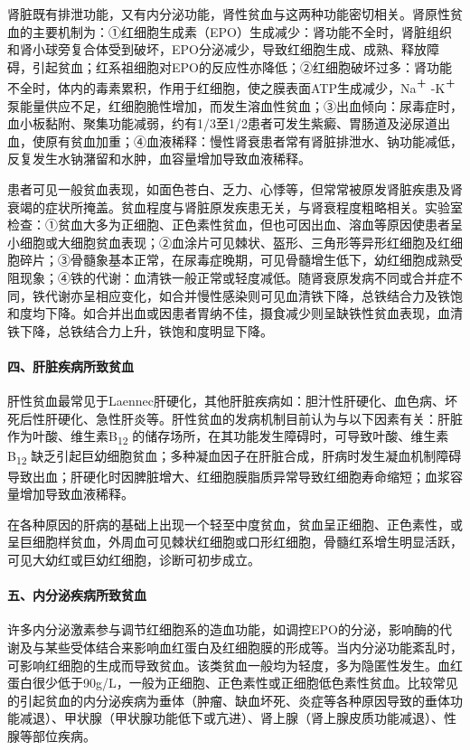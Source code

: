 肾脏既有排泄功能，又有内分泌功能，肾性贫血与这两种功能密切相关。肾原性贫血的主要机制为：①红细胞生成素（EPO）生成减少：肾功能不全时，肾脏组织和肾小球旁复合体受到破坏，EPO分泌减少，导致红细胞生成、成熟、释放障碍，引起贫血；红系祖细胞对EPO的反应性亦降低；②红细胞破坏过多：肾功能不全时，体内的毒素累积，作用于红细胞，使之膜表面ATP生成减少，Na\textsuperscript{＋}
-K\textsuperscript{＋}
泵能量供应不足，红细胞脆性增加，而发生溶血性贫血；③出血倾向：尿毒症时，血小板黏附、聚集功能减弱，约有1/3至1/2患者可发生紫癜、胃肠道及泌尿道出血，使原有贫血加重；④血液稀释：慢性肾衰患者常有肾脏排泄水、钠功能减低，反复发生水钠潴留和水肿，血容量增加导致血液稀释。

患者可见一般贫血表现，如面色苍白、乏力、心悸等，但常常被原发肾脏疾患及肾衰竭的症状所掩盖。贫血程度与肾脏原发疾患无关，与肾衰程度粗略相关。实验室检查：①贫血大多为正细胞、正色素性贫血，但也可因出血、溶血等原因使患者呈小细胞或大细胞贫血表现；②血涂片可见棘状、盔形、三角形等异形红细胞及红细胞碎片；③骨髓象基本正常，在尿毒症晚期，可见骨髓增生低下，幼红细胞成熟受阻现象；④铁的代谢：血清铁一般正常或轻度减低。随肾衰原发病不同或合并症不同，铁代谢亦呈相应变化，如合并慢性感染则可见血清铁下降，总铁结合力及铁饱和度均下降。如合并出血或因患者胃纳不佳，摄食减少则呈缺铁性贫血表现，血清铁下降，总铁结合力上升，铁饱和度明显下降。

\paragraph{四、肝脏疾病所致贫血}

肝性贫血最常见于Laennec肝硬化，其他肝脏疾病如：胆汁性肝硬化、血色病、坏死后性肝硬化、急性肝炎等。肝性贫血的发病机制目前认为与以下因素有关：肝脏作为叶酸、维生素B\textsubscript{12}
的储存场所，在其功能发生障碍时，可导致叶酸、维生素B\textsubscript{12}
缺乏引起巨幼细胞贫血；多种凝血因子在肝脏合成，肝病时发生凝血机制障碍导致出血；肝硬化时因脾脏增大、红细胞膜脂质异常导致红细胞寿命缩短；血浆容量增加导致血液稀释。

在各种原因的肝病的基础上出现一个轻至中度贫血，贫血呈正细胞、正色素性，或呈巨细胞样贫血，外周血可见棘状红细胞或口形红细胞，骨髓红系增生明显活跃，可见大幼红或巨幼红细胞，诊断可初步成立。

\paragraph{五、内分泌疾病所致贫血}

许多内分泌激素参与调节红细胞系的造血功能，如调控EPO的分泌，影响酶的代谢及与某些受体结合来影响血红蛋白及红细胞膜的形成等。当内分泌功能紊乱时，可影响红细胞的生成而导致贫血。该类贫血一般均为轻度，多为隐匿性发生。血红蛋白很少低于90g/L，一般为正细胞、正色素性或正细胞低色素性贫血。比较常见的引起贫血的内分泌疾病为垂体（肿瘤、缺血坏死、炎症等各种原因导致的垂体功能减退）、甲状腺（甲状腺功能低下或亢进）、肾上腺（肾上腺皮质功能减退）、性腺等部位疾病。


